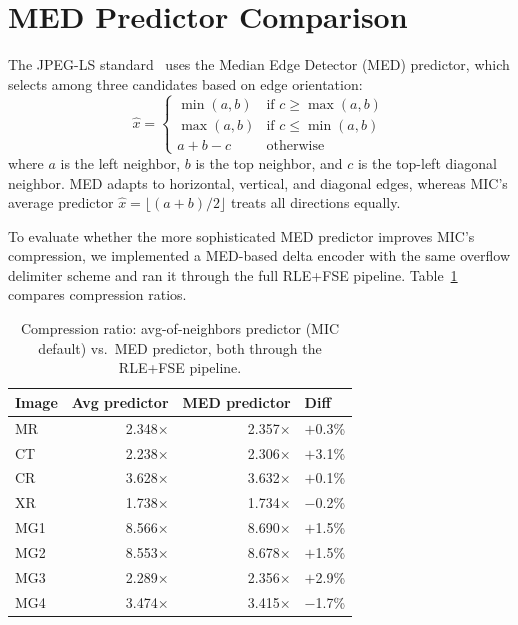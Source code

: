 \documentclass[11pt,twocolumn]{article}
\begin{document}
\section{MED Predictor Comparison}
\label{sec:med}

The JPEG-LS standard~\cite{jpegls} uses the Median Edge Detector (MED) predictor, which selects among three candidates based on edge orientation:
\begin{equation}
    \hat{x} = \begin{cases}
        \min(a,b) & \text{if } c \geq \max(a,b) \\
        \max(a,b) & \text{if } c \leq \min(a,b) \\
        a + b - c & \text{otherwise}
    \end{cases}
\end{equation}
where $a$ is the left neighbor, $b$ is the top neighbor, and $c$ is the top-left diagonal neighbor.
MED adapts to horizontal, vertical, and diagonal edges, whereas MIC's average predictor $\hat{x} = \lfloor(a+b)/2\rfloor$ treats all directions equally.

To evaluate whether the more sophisticated MED predictor improves MIC's compression, we implemented a MED-based delta encoder with the same overflow delimiter scheme and ran it through the full RLE+FSE pipeline.
Table~\ref{tab:med} compares compression ratios.

\begin{table}[t]
\centering
\caption{Compression ratio: avg-of-neighbors predictor (MIC default) vs.\ MED predictor, both through the RLE+FSE pipeline.}
\label{tab:med}
\small
\begin{tabular}{@{}lrrl@{}}
\toprule
Image & Avg predictor & MED predictor & Diff \\
\midrule
MR  & 2.348$\times$ & 2.357$\times$ & $+$0.3\% \\
CT  & 2.238$\times$ & 2.306$\times$ & $+$3.1\% \\
CR  & 3.628$\times$ & 3.632$\times$ & $+$0.1\% \\
XR  & 1.738$\times$ & 1.734$\times$ & $-$0.2\% \\
MG1 & 8.566$\times$ & 8.690$\times$ & $+$1.5\% \\
MG2 & 8.553$\times$ & 8.678$\times$ & $+$1.5\% \\
MG3 & 2.289$\times$ & 2.356$\times$ & $+$2.9\% \\
MG4 & 3.474$\times$ & 3.415$\times$ & $-$1.7\% \\
\bottomrule
\end{tabular}
\end{table}
\end{document}
